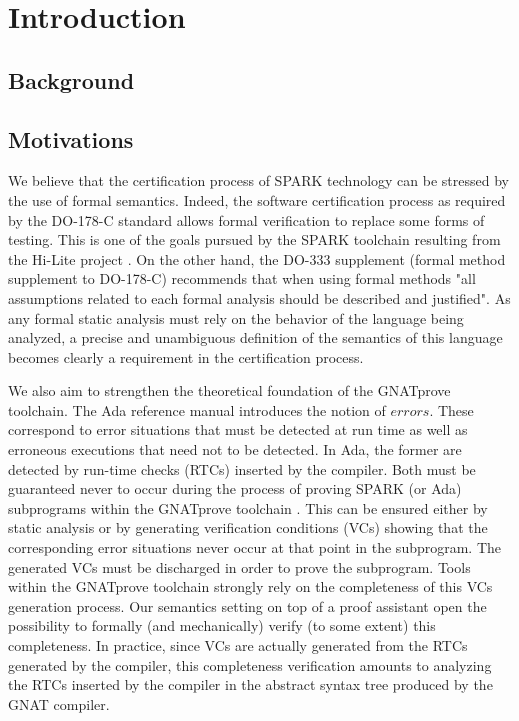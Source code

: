 \section{Introduction}
\subsection{Background}

\subsection{Motivations}

We believe that the certification process of SPARK technology can be
stressed by the use of formal semantics.
Indeed, the software certification process as required by the DO-178-C \cite{RTCA:DO-178} 
standard allows formal verification to replace some forms of testing. 
This is one of the goals pursued by the SPARK toolchain resulting from 
the Hi-Lite project \cite{Hi-Lite:URL}. On the other hand, the DO-333 
supplement \cite{RTCA:DO-333} (formal method supplement to DO-178-C) recommends that 
when using formal methods "all assumptions related to each formal 
analysis should be described and justified". As any formal static 
analysis must rely on the behavior of the language being analyzed, a 
precise and unambiguous definition of the semantics of this language 
becomes clearly a requirement in the certification process.

We also aim to strengthen the theoretical foundation of the GNATprove
toolchain.
The Ada reference manual \cite{Ada:URL} introduces the notion of $\mathit{errors}$.
These correspond to error situations that must be detected 
at run time as well as erroneous executions that need not to be 
detected. In Ada, the former are detected by run-time checks 
(RTCs) inserted by the compiler. Both must be guaranteed never to
occur during the process of proving SPARK (or Ada) subprograms within
the GNATprove toolchain \cite{Gnatprove:URL}. This can be ensured either by static
analysis or by generating verification conditions (VCs) showing that 
the corresponding error situations never occur at that point in the 
subprogram. The generated VCs must be discharged in order to prove the 
subprogram.  Tools within the GNATprove toolchain strongly rely on the 
completeness of this VCs generation process. Our semantics setting on 
top of a proof assistant open the possibility to formally (and 
mechanically) verify (to some extent) this completeness. In practice, 
since VCs are actually generated from the RTCs generated by the 
compiler, this completeness verification amounts to analyzing the RTCs 
inserted by the compiler in the abstract syntax tree produced by the 
GNAT compiler.

